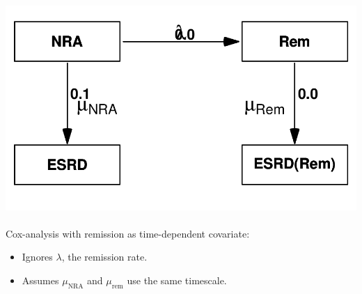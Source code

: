 \begin{frame}
\ \\[-3ex]
\includegraphics[height=0.55\textheight,keepaspectratio]{NRA-death-par4}
\ \\[-1ex]
Cox-analysis with remission as time-dependent covariate:
\begin{itemize}[<+->]
\item Ignores $\lambda$, the remission rate.
\item Assumes $\mu_\text{NRA}$ and $\mu_\text{rem}$ use the same timescale.
\end{itemize}
\end{frame}

